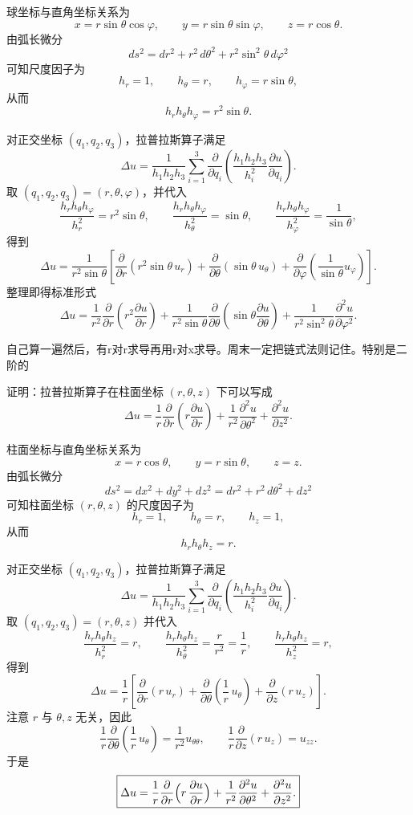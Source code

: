 \begin{solution}
球坐标与直角坐标关系为
\[
x=r\sin\theta\cos\varphi,\qquad
y=r\sin\theta\sin\varphi,\qquad
z=r\cos\theta.
\]
由弧长微分
\[
ds^2=dr^2+r^2\,d\theta^2+r^2\sin^2\theta\,d\varphi^2
\]
可知尺度因子为
\[
h_r=1,\qquad h_\theta=r,\qquad h_\varphi=r\sin\theta,
\]
从而
\[
h_rh_\theta h_\varphi=r^2\sin\theta.
\]

对正交坐标 $(q_1,q_2,q_3)$，拉普拉斯算子满足
\[
\Delta u
=\frac{1}{h_1h_2h_3}\sum_{i=1}^3
\frac{\partial}{\partial q_i}\!\left(
\frac{h_1h_2h_3}{h_i^2}\frac{\partial u}{\partial q_i}
\right).
\]
取 $(q_1,q_2,q_3)=(r,\theta,\varphi)$，并代入
\[
\frac{h_rh_\theta h_\varphi}{h_r^2}=r^2\sin\theta,\qquad
\frac{h_rh_\theta h_\varphi}{h_\theta^2}=\sin\theta,\qquad
\frac{h_rh_\theta h_\varphi}{h_\varphi^2}=\frac{1}{\sin\theta},
\]
得到
\[
\Delta u
=\frac{1}{r^2\sin\theta}\left[
\frac{\partial}{\partial r}\!\left(r^2\sin\theta\,u_r\right)
+\frac{\partial}{\partial\theta}\!\left(\sin\theta\,u_\theta\right)
+\frac{\partial}{\partial\varphi}\!\left(\frac{1}{\sin\theta}u_\varphi\right)
\right].
\]
整理即得标准形式
\[
\boxed{
\Delta u
=\frac1{r^2}\frac{\partial}{\partial r}\!\left(r^2\frac{\partial u}{\partial r}\right)
+\frac{1}{r^2\sin\theta}\frac{\partial}{\partial\theta}\!\left(\sin\theta\frac{\partial u}{\partial\theta}\right)
+\frac{1}{r^2\sin^2\theta}\frac{\partial^2 u}{\partial\varphi^2}.
}
\]
\end{solution}
\begin{dxtips}
    自己算一遍然后，有r对r求导再用r对x求导。周末一定把链式法则记住。特别是二阶的
\end{dxtips}
\begin{homework}[3]
证明：拉普拉斯算子在柱面坐标 $(r,\theta,z)$ 下可以写成
\[
\Delta u
=\frac1r\frac{\partial}{\partial r}\!\left(r\frac{\partial u}{\partial r}\right)
+\frac1{r^2}\frac{\partial^2 u}{\partial\theta^2}
+\frac{\partial^2 u}{\partial z^2}.
\]
\end{homework}
\begin{solution}
柱面坐标与直角坐标关系为
\[
x=r\cos\theta,\qquad y=r\sin\theta,\qquad z=z.
\]
由弧长微分
\[
ds^2=dx^2+dy^2+dz^2
=dr^2+r^2\,d\theta^2+dz^2
\]
可知柱面坐标 $(r,\theta,z)$ 的尺度因子为
\[
h_r=1,\qquad h_\theta=r,\qquad h_z=1,
\]
从而
\[
h_rh_\theta h_z=r.
\]

对正交坐标 $(q_1,q_2,q_3)$，拉普拉斯算子满足
\[
\Delta u
=\frac{1}{h_1h_2h_3}\sum_{i=1}^3
\frac{\partial}{\partial q_i}\!\left(
\frac{h_1h_2h_3}{h_i^2}\frac{\partial u}{\partial q_i}
\right).
\]
取 $(q_1,q_2,q_3)=(r,\theta,z)$ 并代入
\[
\frac{h_rh_\theta h_z}{h_r^2}=r,\qquad
\frac{h_rh_\theta h_z}{h_\theta^2}=\frac{r}{r^2}=\frac1r,\qquad
\frac{h_rh_\theta h_z}{h_z^2}=r,
\]
得到
\[
\Delta u
=\frac1r\left[
\frac{\partial}{\partial r}\!\left(r\,u_r\right)
+\frac{\partial}{\partial\theta}\!\left(\frac1r\,u_\theta\right)
+\frac{\partial}{\partial z}\!\left(r\,u_z\right)
\right].
\]
注意 $r$ 与 $\theta,z$ 无关，因此
\[
\frac1r\frac{\partial}{\partial\theta}\!\left(\frac1r\,u_\theta\right)
=\frac1{r^2}u_{\theta\theta},
\qquad
\frac1r\frac{\partial}{\partial z}\!\left(r\,u_z\right)=u_{zz}.
\]
于是
\[
\boxed{
\Delta u
=\frac1r\frac{\partial}{\partial r}\Bigl(r\,\frac{\partial u}{\partial r}\Bigr)
+\frac1{r^2}\frac{\partial^2 u}{\partial\theta^2}
+\frac{\partial^2 u}{\partial z^2}.
}
\]
\end{solution}
